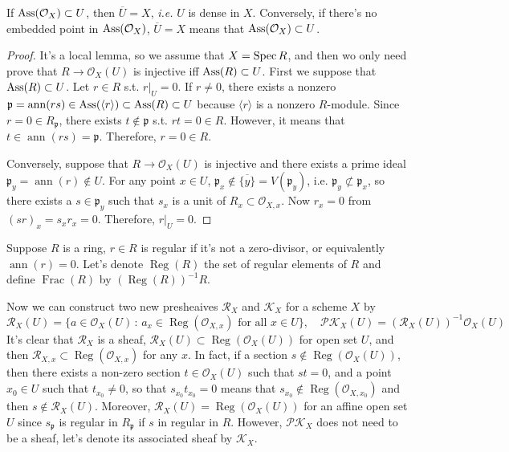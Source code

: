 If $\operatorname{Ass}(\mathcal O_X)\subset U$, then $\overline U=X$, \textit{i.e.} $U$ is dense 
in $X$.  Conversely, if there's no embedded point in $\operatorname{Ass}(\mathcal O_X)$, 
$\overline U=X$ means that $\operatorname{Ass}(\mathcal O_X)\subset U$.

\begin{proof}
It's a local lemma, so we assume that $X=\operatorname{Spec} R$, and then wo only need prove 
that $R\to \mathcal O_X(U)$ is injective iff $\operatorname{Ass}(R)\subset U$.
First we suppose that $\operatorname{Ass}(R)\subset U$. Let $r\in R$ s.t. $r|_U=0$. If $r\neq 0$,
there exists a nonzero $\mathfrak p=\operatorname{ann}(rs)\in \operatorname{Ass}(\langle r\rangle)
\subset \operatorname{Ass}(R)\subset U$
because $\langle r\rangle$ is a nonzero $R$-module. Since $r=0 \in R_{\mathfrak p}$,
there exists $t\not\in \mathfrak p$ s.t. $rt=0\in R$. However, it means that
$t\in \operatorname{ann}(rs)=\mathfrak p$. Therefore, $r=0\in R$.

Conversely, suppose that $R\to \mathcal O_X(U)$ is injective and there exists a 
prime ideal $\mathfrak p_y = \operatorname{ann}(r)\not\in U$. For any point $x\in U$,
$\mathfrak p_x\not\in \overline{\{y\}}=V(\mathfrak p_y)$, i.e. 
$\mathfrak p_y \not\subset \mathfrak p_x$, so there exists a $s\in \mathfrak p_y$ 
such that $s_x$ is a unit of $R_x\subset \mathcal O_{X,x}$. Now $r_x=0$ from 
$(sr)_x=s_xr_x=0$. Therefore, $r|_U=0$.
\end{proof}

\begin{defi}
Suppose $R$ is a ring, $r\in R$ is regular if it's not a zero-divisor, 
or equivalently $\operatorname{ann}(r)=0$. Let's denote $\operatorname{Reg}(R)$
the set of regular elements of $R$ and define $\operatorname{Frac}(R)$ by
$(\operatorname{Reg}(R))^{-1}R$.
\end{defi}

Now we can construct two new presheaives $\mathcal R_X$ and $\mathcal K_X$ for a 
scheme $X$ by 
\[
	\mathcal R_X(U)=\{a\in \mathcal O_X(U)\,:\, a_x\in 
	\operatorname{Reg}(\mathcal O_{X,x})\text{ for all $x\in U$}\},
	\quad \mathcal{PK}_X(U)= (\mathcal R_X(U))^{-1}\mathcal O_X(U)
\]
It's clear that $\mathcal R_X$ is a sheaf,  
$\mathcal R_X(U)\subset \operatorname{Reg}(\mathcal O_X(U))$ for open set $U$, 
and then $\mathcal R_{X,x} \subset \operatorname{Reg}(\mathcal O_{X,x})$ for any $x$.
In fact, if a section $s\not\in \operatorname{Reg}(\mathcal O_X(U))$, then there exists 
a non-zero section $t\in \mathcal O_X(U)$ such that $st=0$, and a point $x_0\in U$ 
such that $t_{x_0}\neq 0$, so that $s_{x_0}t_{x_0}=0$ means that $s_{x_{0}}\not\in 
\operatorname{Reg}(\mathcal O_{X,x_0})$ and then $s\not\in \mathcal R_X(U)$. Moreover,
$\mathcal R_X(U)=\operatorname{Reg}(\mathcal O_X(U))$ for an affine open set $U$ since
$s_{\mathfrak p}$ is regular in $R_{\mathfrak p}$ if $s$ in regular in $R$.
However, $\mathcal{PK}_X$ does not need to be a sheaf, let's denote its 
associated sheaf by $\mathcal K_X$.


